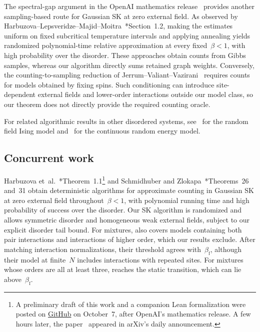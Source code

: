 \documentclass[letterpaper,11pt,reqno]{amsart}
\begin{document}
The spectral-gap argument in the OpenAI mathematics release~\cite{OAI26gap} provides another sampling-based route for Gaussian SK at zero external field. As observed by Harbuzova--Lepsveridze--Majid--Moitra~\cite{HLMM26}*{Section~1.2}, making the estimates uniform on fixed subcritical temperature intervals and applying annealing yields randomized polynomial-time relative approximation at every fixed~$\beta<1$, with high probability over the disorder. These approaches obtain counts from Gibbs samples, whereas our algorithm directly sums retained graph weights. Conversely, the counting-to-sampling reduction of Jerrum--Valiant--Vazirani~\cite{JVV86} requires counts for models obtained by fixing spins. Such conditioning can introduce site-dependent external fields and lower-order interactions outside our model class, so our theorem does not directly provide the required counting oracle.

For related algorithmic results in other disordered systems, see~\cites{HLP23,AEGP26,Han26} for the random field Ising model and~\cites{Ho25,LW25} for the continuous random energy model.


\subsection{Concurrent work}\label{subsec:concurrent-work}

Harbuzova et~al.~\cite{HLMM26}*{Theorem~1.1}\footnote{A preliminary draft of this work and a companion Lean formalization were posted on \href{https://github.com/qiangwu2/AI-assisted-results/tree/main/approximate-counting-spin-glasses}{GitHub} on October~7, after OpenAI's mathematics release. A few hours later, the paper~\cite{HLMM26} appeared in arXiv's daily announcement.} and Schmidhuber and Zlokapa~\cite{SZ26}*{Theorems~26 and~31} obtain deterministic algorithms for approximate counting in Gaussian SK at zero external field throughout~$\beta<1$, with polynomial running time and high probability of success over the disorder. Our SK algorithm is randomized and allows symmetric disorder and homogeneous weak external fields, subject to our explicit disorder tail bound. For mixtures, \cite{HLMM26} also covers models containing both pair interactions and interactions of higher order, which our results exclude. After matching interaction normalizations, their threshold agrees with~$\beta_{\mathrm f}$, although their model at finite~$N$ includes interactions with repeated sites. For mixtures whose orders are all at least three, \cite{SZ26} reaches the static transition, which can lie above~$\beta_{\mathrm f}$.
\end{document}
